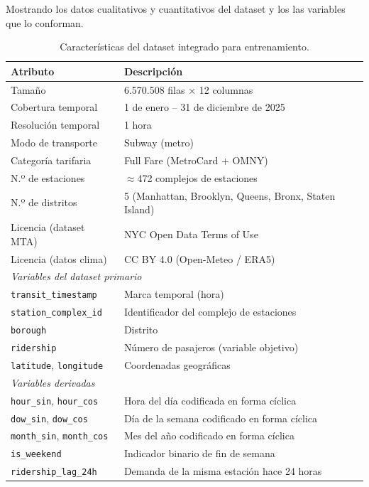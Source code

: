 \documentclass[preprint,12pt]{elsarticle}
\begin{document}
Mostrando los datos cualitativos y cuantitativos del dataset y los las variables que lo conforman.

\begin{table}[htbp]
\centering
\caption{Características del dataset integrado para entrenamiento.}
\label{tab:dataset_final}
\small
\begin{tabular}{p{4cm} p{8.5cm}}
\toprule
\textbf{Atributo} & \textbf{Descripción} \\
\midrule
Tamaño & 6.570.508 filas × 12 columnas \\
Cobertura temporal & 1 de enero -- 31 de diciembre de 2025 \\
Resolución temporal & 1 hora \\
Modo de transporte & Subway (metro) \\
Categoría tarifaria & Full Fare (MetroCard + OMNY) \\
N.º de estaciones & $\approx$472 complejos de estaciones \\
N.º de distritos & 5 (Manhattan, Brooklyn, Queens, Bronx, Staten Island) \\
Licencia (dataset MTA) & NYC Open Data Terms of Use \\
Licencia (datos clima) & CC BY 4.0 (Open-Meteo / ERA5) \\
\midrule
\multicolumn{2}{l}{\textit{Variables del dataset primario}} \\
\midrule
\texttt{transit\_timestamp} & Marca temporal (hora) \\
\texttt{station\_complex\_id} & Identificador del complejo de estaciones \\
\texttt{borough} & Distrito \\
\texttt{ridership} & Número de pasajeros (variable objetivo) \\
\texttt{latitude}, \texttt{longitude} & Coordenadas geográficas \\
\midrule
\multicolumn{2}{l}{\textit{Variables derivadas}} \\
\midrule
\texttt{hour\_sin}, \texttt{hour\_cos} & Hora del día codificada en forma cíclica \\
\texttt{dow\_sin}, \texttt{dow\_cos} & Día de la semana codificado en forma cíclica \\
\texttt{month\_sin}, \texttt{month\_cos} & Mes del año codificado en forma cíclica \\
\texttt{is\_weekend} & Indicador binario de fin de semana \\
\texttt{ridership\_lag\_24h} & Demanda de la misma estación hace 24 horas \\

\end{tabular}
\end{table}
\end{document}
